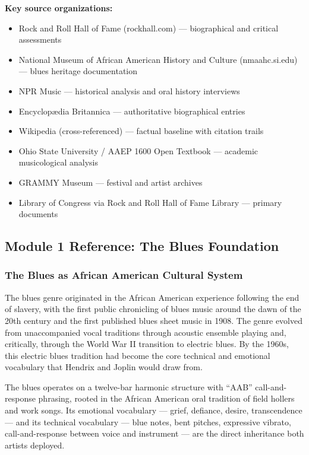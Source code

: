 \documentclass[11pt,letterpaper]{article}
\begin{document}
\textbf{Key source organizations:}
\begin{itemize}[leftmargin=*]
  \item Rock and Roll Hall of Fame (rockhall.com) --- biographical and critical assessments
  \item National Museum of African American History and Culture (nmaahc.si.edu) --- blues heritage documentation
  \item NPR Music --- historical analysis and oral history interviews
  \item Encyclop\ae dia Britannica --- authoritative biographical entries
  \item Wikipedia (cross-referenced) --- factual baseline with citation trails
  \item Ohio State University / AAEP 1600 Open Textbook --- academic musicological analysis
  \item GRAMMY Museum --- festival and artist archives
  \item Library of Congress via Rock and Roll Hall of Fame Library --- primary documents
\end{itemize}

\subsection{Module 1 Reference: The Blues Foundation}

\subsubsection{The Blues as African American Cultural System}

The blues genre originated in the African American experience following the end of slavery, with the first public chronicling of blues music around the dawn of the 20th century and the first published blues sheet music in 1908. The genre evolved from unaccompanied vocal traditions through acoustic ensemble playing and, critically, through the World War II transition to electric blues. By the 1960s, this electric blues tradition had become the core technical and emotional vocabulary that Hendrix and Joplin would draw from.

The blues operates on a twelve-bar harmonic structure with ``AAB'' call-and-response phrasing, rooted in the African American oral tradition of field hollers and work songs. Its emotional vocabulary --- grief, defiance, desire, transcendence --- and its technical vocabulary --- blue notes, bent pitches, expressive vibrato, call-and-response between voice and instrument --- are the direct inheritance both artists deployed.
\end{document}
